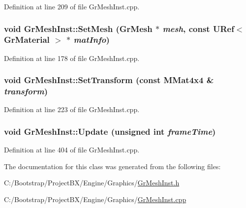 Definition at line 209 of file GrMeshInst.cpp.\hypertarget{class_gr_mesh_inst_ebabf6ad0f5987ec8b68248762c9f993}{
\subsubsection[{SetMesh}]{\setlength{\rightskip}{0pt plus 5cm}void GrMeshInst::SetMesh ({\bf GrMesh} $\ast$ {\em mesh}, \/  const {\bf URef}$<$ {\bf GrMaterial} $>$ $\ast$ {\em matInfo})}}
\label{class_gr_mesh_inst_ebabf6ad0f5987ec8b68248762c9f993}




Definition at line 178 of file GrMeshInst.cpp.\hypertarget{class_gr_mesh_inst_537661a0767b6c95785f95088325d80d}{
\subsubsection[{SetTransform}]{\setlength{\rightskip}{0pt plus 5cm}void GrMeshInst::SetTransform (const {\bf MMat4x4} \& {\em transform})}}
\label{class_gr_mesh_inst_537661a0767b6c95785f95088325d80d}




Definition at line 223 of file GrMeshInst.cpp.\hypertarget{class_gr_mesh_inst_4dbbdac352eec02a919c9d7c449663b3}{
\subsubsection[{Update}]{\setlength{\rightskip}{0pt plus 5cm}void GrMeshInst::Update (unsigned int {\em frameTime})}}
\label{class_gr_mesh_inst_4dbbdac352eec02a919c9d7c449663b3}




Definition at line 404 of file GrMeshInst.cpp.

The documentation for this class was generated from the following files:\begin{CompactItemize}
\item 
C:/Bootstrap/ProjectBX/Engine/Graphics/\hyperlink{_gr_mesh_inst_8h}{GrMeshInst.h}\item 
C:/Bootstrap/ProjectBX/Engine/Graphics/\hyperlink{_gr_mesh_inst_8cpp}{GrMeshInst.cpp}\end{CompactItemize}
